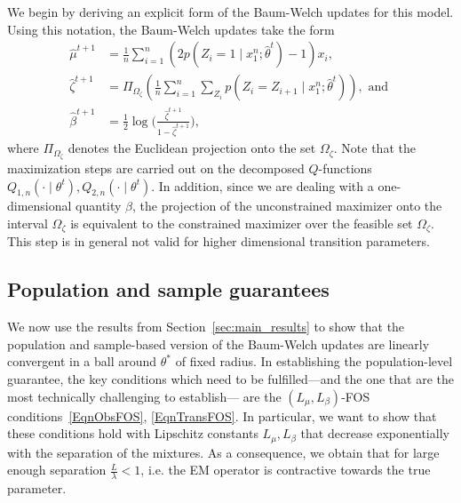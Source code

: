 \documentclass[twoside,11pt]{article}
\newcommand{\numobs}{\ensuremath{n}}
\newcommand{\paramobs}{\mu}
\newcommand{\paramitsamp}{\ensuremath{\widehat{\paramobs}}} %
\newcommand{\paramtrans}{\beta}
\newcommand{\paramspacep}{\ensuremath{\Omega_\matprob}}
\newcommand{\paramjoint}{\theta}
\newcommand{\trueparamjoint}{\paramjoint^*}
\newcommand{\paramjointhat}{\widehat{\paramjoint}}
\newcommand{\qfunsampobs}[2]{\ensuremath{Q_{1,\numobs}(#1 \mid #2)}}
\newcommand{\qfunsamptrans}[2]{\ensuremath{Q_{2,\numobs}(#1 \mid #2)}}
\newcommand{\probpar}{\zeta}
\newcommand{\matprob}{\probpar}
\newcommand{\matprobhat}{\widehat{\matprob}}
\newcommand{\probparhat}{\matprobhat}
\newcommand{\paramtranshat}{\widehat{\paramtrans}}
\begin{document}
We begin by deriving an explicit form of the Baum-Welch updates for
this model.  
Using this notation, the Baum-Welch updates take the form
\begin{subequations}
\label{eq:normalHMM_EMupdate} 
\begin{align}
\paramitsamp^{t+1} &= \frac{1}{\numobs} \sum_{i =1}^{\numobs} ( 2 p(Z_i = 1
\mid x_1^{\numobs}; \paramjointhat^t)-1) x_i, \\
%
\matprobhat^{t+1} & = \Pi_{\paramspacep} \left( \frac{1}{\numobs} \sum_{i=1}^n
  \sum_{Z_i} p(Z_{i} = Z_{i+1} \mid x_1^{\numobs}; \paramjointhat^t)
\right), \text{ and } \\
%
\paramtranshat^{t+1} &= \frac{1}{2} \log \big(
\frac{\probparhat^{t+1}}{1 - \probparhat^{t+1}} \big),
\end{align}
\end{subequations}
where $\Pi_{\paramspacep}$ denotes the Euclidean projection onto the
set $\paramspacep$. Note that the maximization steps are carried out 
on the decomposed $Q$-functions $\qfunsampobs{\cdot}{\paramjoint^t},
\qfunsamptrans{\cdot}{\paramjoint^t}$. In addition, since we are 
dealing with a one-dimensional quantity $\paramtrans$, the projection
of the unconstrained maximizer onto the interval $\paramspacep$
is equivalent to the constrained maximizer over the feasible set 
$\paramspacep$. This step is in general not valid for higher
dimensional transition parameters. 
%


\subsection{Population and sample guarantees}

We now use the results from Section~\ref{sec:main_results} to
show that the population and sample-based version of the Baum-Welch
updates are linearly convergent in a ball around $\trueparamjoint$
of fixed radius.  In establishing the population-level
guarantee, the key conditions which need to be fulfilled---and the one
that are the most technically challenging to establish--- are the
$(L_{\paramobs}, L_{\paramtrans})$-FOS conditions~\eqref{EqnObsFOS},
\eqref{EqnTransFOS}. In particular, we want to show that these
conditions hold with Lipschitz constants $L_{\paramobs}, L_{\paramtrans}$ that decrease
exponentially with the separation of the mixtures. As a consequence,
we obtain that for large enough separation $\frac{L}{\lambda} <1$, i.e.
 the EM operator is contractive towards the true parameter. 
\end{document}
